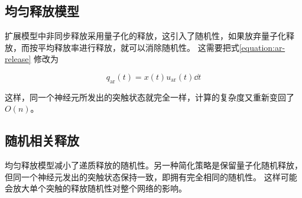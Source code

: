 \subsection{均匀释放模型}
扩展模型中非同步释放采用量子化的释放，这引入了随机性，如果放弃量子化释放，而按平均释放率进行释放，就可以消除随机性。
这需要把式\ref{equation:ar-release}
修改为

\begin{equation}
q_\text{ar}(t) = x(t) u_\text{ar}(t)\dd{t}
\label{equation:ar-release-simplified}
\end{equation}

这样，同一个神经元所发出的突触状态就完全一样，计算的复杂度又重新变回了 $O(n)$。

\subsection{随机相关释放}
均匀释放模型减小了递质释放的随机性。另一种简化策略是保留量子化随机释放，但同一个神经元发出的突触状态保持一致，即拥有完全相同的随机性。
这样可能会放大单个突触的释放随机性对整个网络的影响。
